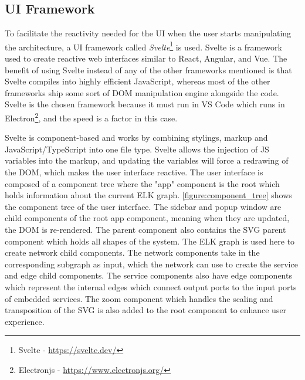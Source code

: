 \subsection{UI Framework}
To facilitate the reactivity needed for the UI when the user starts manipulating the architecture, a UI framework called \textit{Svelte}\footnote{Svelte - \url{https://svelte.dev/}} is used.
Svelte is a framework used to create reactive web interfaces similar to React, Angular, and Vue. The benefit of using Svelte instead of any of the other frameworks mentioned is that Svelte compiles into highly efficient JavaScript,
whereas most of the other frameworks ship some sort of DOM manipulation engine alongside the code. Svelte is the chosen framework because it must run in VS Code which runs in Electron\footnote{Electronjs - \url{https://www.electronjs.org/}}, and the speed is a factor in this case.

Svelte is component-based and works by combining stylings, markup and JavaScript/TypeScript into one file type. Svelte allows the injection of JS variables into the markup, and updating the variables will force a redrawing of the DOM, which makes the user interface reactive.
The user interface is composed of a component tree where the "app" component is the root which holds information about the current ELK graph. \cref{figure:component_tree} shows the component tree of the user interface. The sidebar and popup window are child components of the root app component, meaning when they are updated, the DOM is re-rendered. 
The parent component also contains the SVG parent component which holds all shapes of the system.
The ELK graph is used here to create network child components. The network components take in the corresponding subgraph as input, which the network can use to create the service and edge child components.
The service components also have edge components which represent the internal edges which connect output ports to the input ports of embedded services.
The zoom component which handles the scaling and transposition of the SVG is also added to the root component to enhance user experience.

